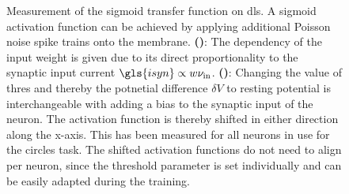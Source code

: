 \begin{figure}
	\begin{subfigure}[c]{0.5\textwidth}
		\centering
		\caption{}
		
		\label{dlsactivationfunctionweight}
	\end{subfigure}	
	\begin{subfigure}[c]{0.5\textwidth}
		\centering
		\caption{}
		
		\label{dlsactivationfunctionbias}
	\end{subfigure}
	\caption[Measurement of the sigmoid transfer function on \gls{dls}]{Measurement of the sigmoid transfer function on \gls{dls}. A sigmoid activation function can be achieved by applying additional Poisson noise spike trains onto the membrane. \textbf{()}: The dependency of the input weight is given due to its direct proportionality to the synaptic input current $\gls{isyn} \propto w \nu_\text{in}$. \textbf{()}: Changing the value of \gls{thres} and thereby the potnetial difference $\delta V$ to resting potential is interchangeable with adding a bias to the synaptic input of the neuron. The activation function is thereby shifted in either direction along the x-axis. This has been measured for all neurons in use for the circles task. The shifted activation functions do not need to align per neuron, since the threshold parameter is set individually and can be easily adapted during the training.}
\end{figure}
%
%		




